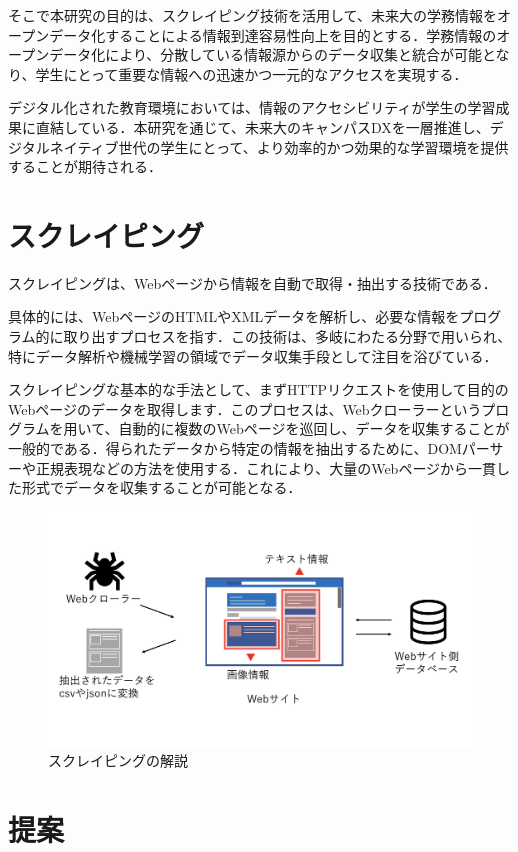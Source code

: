 \documentclass[11pt]{ujarticle}
\begin{document}
そこで本研究の目的は、スクレイピング技術を活用して、未来大の学務情報をオープンデータ化することによる情報到達容易性向上を目的とする．学務情報のオープンデータ化により、分散している情報源からのデータ収集と統合が可能となり、学生にとって重要な情報への迅速かつ一元的なアクセスを実現する．

デジタル化された教育環境においては、情報のアクセシビリティが学生の学習成果に直結している．本研究を通じて、未来大のキャンパスDXを一層推進し、デジタルネイティブ世代の学生にとって、より効率的かつ効果的な学習環境を提供することが期待される．


\section{スクレイピング}

スクレイピングは、Webページから情報を自動で取得・抽出する技術である．

具体的には、WebページのHTMLやXMLデータを解析し、必要な情報をプログラム的に取り出すプロセスを指す．この技術は、多岐にわたる分野で用いられ、特にデータ解析や機械学習の領域でデータ収集手段として注目を浴びている．

スクレイピングな基本的な手法として、まずHTTPリクエストを使用して目的のWebページのデータを取得します．このプロセスは、Webクローラーというプログラムを用いて、自動的に複数のWebページを巡回し、データを収集することが一般的である．得られたデータから特定の情報を抽出するために、DOMパーサーや正規表現などの方法を使用する．これにより、大量のWebページから一貫した形式でデータを収集することが可能となる．

\begin{figure}[h]
	\includegraphics[width=0.9\linewidth]{./src/selenium.png}
	\caption{スクレイピングの解説}
  \label{fig:arch}
\end{figure}

\section{提案}
\end{document}
